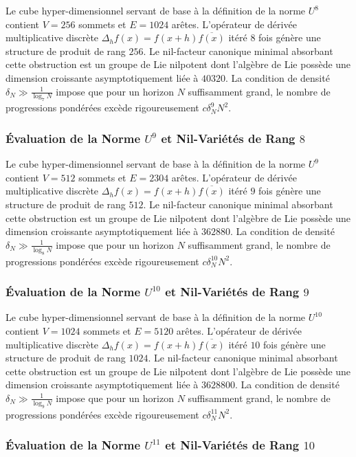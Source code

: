 \documentclass[11pt,a4paper]{article}
\begin{document}
Le cube hyper-dimensionnel servant de base à la définition de la norme $U^{8}$ contient $V = 256$ sommets et $E = 1024$ arêtes. L'opérateur de dérivée multiplicative discrète $\Delta_h f(x) = f(x+h)\overline{f(x)}$ itéré $8$ fois génère une structure de produit de rang $256$. Le nil-facteur canonique minimal absorbant cette obstruction est un groupe de Lie nilpotent dont l'algèbre de Lie possède une dimension croissante asymptotiquement liée à $40320$. La condition de densité $\delta_N \gg \frac{1}{\log_{7} N}$ impose que pour un horizon $N$ suffisamment grand, le nombre de progressions pondérées excède rigoureusement $c \delta_N^{9} N^2$. \subsubsection{Évaluation de la Norme $U^{9}$ et Nil-Variétés de Rang $8$}
Le cube hyper-dimensionnel servant de base à la définition de la norme $U^{9}$ contient $V = 512$ sommets et $E = 2304$ arêtes. L'opérateur de dérivée multiplicative discrète $\Delta_h f(x) = f(x+h)\overline{f(x)}$ itéré $9$ fois génère une structure de produit de rang $512$. Le nil-facteur canonique minimal absorbant cette obstruction est un groupe de Lie nilpotent dont l'algèbre de Lie possède une dimension croissante asymptotiquement liée à $362880$. La condition de densité $\delta_N \gg \frac{1}{\log_{8} N}$ impose que pour un horizon $N$ suffisamment grand, le nombre de progressions pondérées excède rigoureusement $c \delta_N^{10} N^2$. \subsubsection{Évaluation de la Norme $U^{10}$ et Nil-Variétés de Rang $9$}
Le cube hyper-dimensionnel servant de base à la définition de la norme $U^{10}$ contient $V = 1024$ sommets et $E = 5120$ arêtes. L'opérateur de dérivée multiplicative discrète $\Delta_h f(x) = f(x+h)\overline{f(x)}$ itéré $10$ fois génère une structure de produit de rang $1024$. Le nil-facteur canonique minimal absorbant cette obstruction est un groupe de Lie nilpotent dont l'algèbre de Lie possède une dimension croissante asymptotiquement liée à $3628800$. La condition de densité $\delta_N \gg \frac{1}{\log_{9} N}$ impose que pour un horizon $N$ suffisamment grand, le nombre de progressions pondérées excède rigoureusement $c \delta_N^{11} N^2$. \subsubsection{Évaluation de la Norme $U^{11}$ et Nil-Variétés de Rang $10$}
\end{document}
